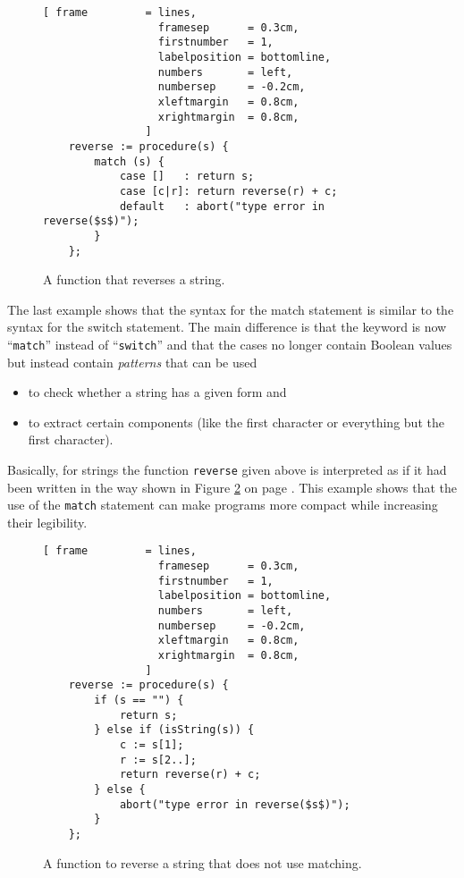 \begin{figure}[!ht]
\centering
\begin{Verbatim}[ frame         = lines, 
                  framesep      = 0.3cm, 
                  firstnumber   = 1,
                  labelposition = bottomline,
                  numbers       = left,
                  numbersep     = -0.2cm,
                  xleftmargin   = 0.8cm,
                  xrightmargin  = 0.8cm,
                ]
    reverse := procedure(s) {
        match (s) {
            case []   : return s;
            case [c|r]: return reverse(r) + c;
            default   : abort("type error in reverse($s$)");
        }
    };
\end{Verbatim}
\vspace*{-0.3cm}
\caption{A function that reverses a string.}
\label{fig:reverse.stlx}
\end{figure}

The last example shows that the syntax for the match statement  is similar to the syntax for the switch
statement.  The main difference is that the keyword is now ``\texttt{match}'' instead of
``\texttt{switch}'' and that the cases no longer contain Boolean values but instead contain
\emph{patterns} that can be used 
\begin{itemize}
\item to check whether a string has a given form and 
\item to extract certain components (like the first character or everything but the first character).  
\end{itemize}
Basically, for strings the function \texttt{reverse} given above is interpreted as if it
had been written in the way shown in Figure \ref{fig:reverse-long.stlx} on page \pageref{fig:reverse-long.stlx}.
This example shows that the use of the \texttt{match} statement can make programs more compact while
increasing their legibility.

\begin{figure}[!ht]
\centering
\begin{Verbatim}[ frame         = lines, 
                  framesep      = 0.3cm, 
                  firstnumber   = 1,
                  labelposition = bottomline,
                  numbers       = left,
                  numbersep     = -0.2cm,
                  xleftmargin   = 0.8cm,
                  xrightmargin  = 0.8cm,
                ]
    reverse := procedure(s) {
        if (s == "") {
            return s;
        } else if (isString(s)) {
            c := s[1];
            r := s[2..];
            return reverse(r) + c;
        } else {
            abort("type error in reverse($s$)");
        }
    };
\end{Verbatim}
\vspace*{-0.3cm}
\caption{A function to reverse a string that does not use matching.}
\label{fig:reverse-long.stlx}
\end{figure}

